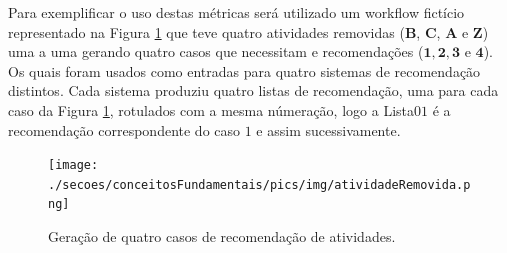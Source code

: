 Para exemplificar o uso destas métricas será utilizado um workflow fictício representado na Figura \ref{figura_atividades_removidas} que teve quatro atividades removidas (\textbf{B}, \textbf{C}, \textbf{A} e \textbf{Z}) uma a uma gerando quatro casos que necessitam e recomendações (\(\mathbf{1}, \mathbf{2}, \mathbf{3}\) e \(\mathbf{4}\)). Os quais foram usados como entradas para quatro sistemas de recomendação distintos. Cada sistema produziu quatro listas de recomendação, uma para cada caso da Figura \ref{figura_atividades_removidas}, rotulados com a mesma númeração, logo a Lista\(01\) é a recomendação correspondente do caso \(1\) e assim sucessivamente.
\begin{figure}[!htb]
    \centering   
    \caption{Geração de quatro casos de recomendação de atividades.}
    \texttt{[image: ./secoes/conceitosFundamentais/pics/img/atividadeRemovida.png]}
	\label{figura_atividades_removidas}
\end{figure}

